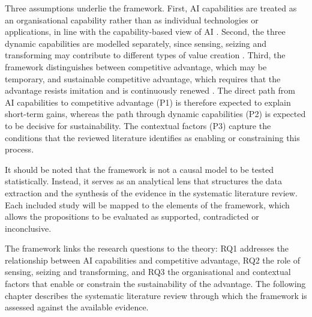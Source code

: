 Three assumptions underlie the framework. First, AI capabilities are treated as an organisational capability rather than as individual technologies or applications, in line with the capability-based view of AI \parencite[1]{mikalef2021capability}. Second, the three dynamic capabilities are modelled separately, since sensing, seizing and transforming may contribute to different types of value creation \parencite[1]{huang2026}. Third, the framework distinguishes between competitive advantage, which may be temporary, and sustainable competitive advantage, which requires that the advantage resists imitation and is continuously renewed \parencites[99]{barney1991}[1319]{teece2007}. The direct path from AI capabilities to competitive advantage (P1) is therefore expected to explain short-term gains, whereas the path through dynamic capabilities (P2) is expected to be decisive for sustainability. The contextual factors (P3) capture the conditions that the reviewed literature identifies as enabling or constraining this process.

It should be noted that the framework is not a causal model to be tested statistically. Instead, it serves as an analytical lens that structures the data extraction and the synthesis of the evidence in the systematic literature review. Each included study will be mapped to the elements of the framework, which allows the propositions to be evaluated as supported, contradicted or inconclusive.

The framework links the research questions to the theory: RQ1 addresses the relationship between AI capabilities and competitive advantage, RQ2 the role of sensing, seizing and transforming, and RQ3 the organisational and contextual factors that enable or constrain the sustainability of the advantage. The following chapter describes the systematic literature review through which the framework is assessed against the available evidence.
